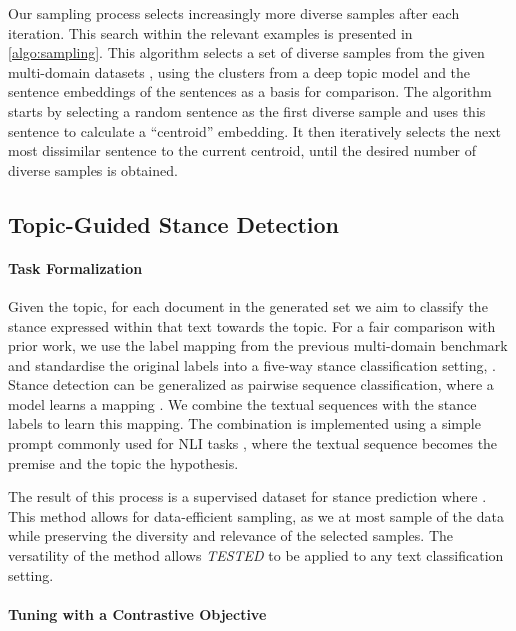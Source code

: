 \documentclass[11pt]{article}
\begin{document}
Our sampling process selects increasingly more diverse samples after each iteration. This search within the relevant examples is presented in \autoref{algo:sampling}.
This algorithm selects a set of diverse samples from the given multi-domain datasets , using the clusters from a deep topic model  and the sentence embeddings  of the sentences as a basis for comparison. The algorithm starts by selecting a random sentence as the first diverse sample and uses this sentence to calculate a ``centroid'' embedding. It then iteratively selects the next most dissimilar sentence to the current centroid, until the desired number of diverse samples is obtained.



\subsection{Topic-Guided Stance Detection}\label{sec:methods:stance}

\paragraph{Task Formalization}

Given the topic,  for each document  in the generated set  we aim to classify the stance expressed within that text towards the topic. For a fair comparison with prior work, we use the label mapping from the previous multi-domain benchmark \citep{hardalov2021cross} and standardise the original labels  into a five-way stance classification setting, . Stance detection can be generalized as pairwise sequence classification, where a model learns a mapping . We combine the textual sequences with the stance labels to learn this mapping. The combination is implemented using a simple prompt commonly used for NLI tasks \cite{lan2019albert, raffel2020exploring,hambardzumyan2021warp}, where the textual sequence becomes the premise and the topic the hypothesis.




The result of this process is a supervised dataset for stance prediction  where . This method allows for data-efficient sampling, as we at most sample  of the data while preserving the diversity and relevance of the selected samples. The versatility of the method allows \emph{TESTED} to be applied to any text classification setting.

\paragraph{Tuning with a Contrastive Objective}
\end{document}
